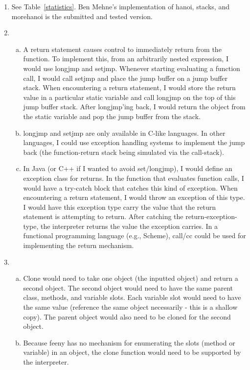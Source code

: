 \documentclass[notitlepage]{report}
\begin{document}
\begin{enumerate}
	\item
			See Table~\ref{statistics}.  Ben Mehne's implementation of hanoi, stacks, and morehanoi is the submitted and tested version.
	\item
		\begin{enumerate}[(a)]
			\item A return statement causes control to immediately return from the function.  To implement this, from an arbitrarily nested expression, I would use longjmp and setjmp.  Whenever starting evaluating a function call, I would call setjmp and place the jump buffer on a jump buffer stack.  When encountering a return statement, I would store the return value in a particular static variable and call longjmp on the top of this jump buffer stack. After longjmp'ing back, I would return the object from the static variable and pop the jump buffer from the stack.
			\item longjmp and setjmp are only available in C-like languages.  In other languages, I could use exception handling systems to implement the jump back (the function-return stack being simulated via the call-stack).
			\item In Java (or C++ if I wanted to avoid set/longjmp), I would define an exception class for returns.  In the function that evaluates function calls, I would have a try-catch block that catches this kind of exception.  When encountering a return statement, I would throw an exception of this type.  I would have this exception type carry the value that the return statement is attempting to return.  After catching the return-exception-type, the interpreter returns the value the exception carries. In a functional programming language (e.g., Scheme), call/cc could be used for implementing the return mechanism.
		\end{enumerate}
	\item
		\begin{enumerate}[(a)]
			\item Clone would need to take one object (the inputted object) and return a second object.  The second object would need to have the same parent class, methods, and variable slots.  Each variable slot would need to have the same value (reference the same object necessarily - this is a shallow copy).  The parent object would also need to be cloned for the second object.
			\item Because feeny has no mechanism for enumerating the slots (method or variable) in an object, the clone function would need to be supported by the interpreter.

\end{enumerate}
\end{enumerate}
\end{document}
